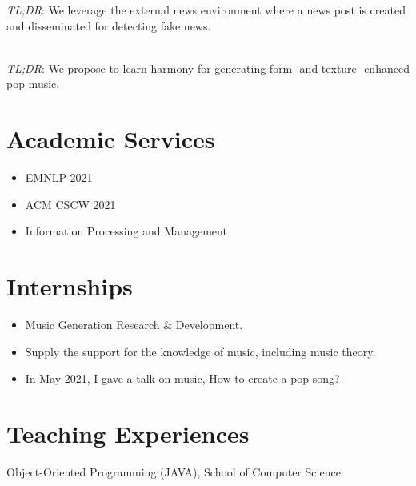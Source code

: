 \documentclass{resume}
\begin{document}
{{
{\small {}
\small
\textit{TL;DR}: We leverage the external news environment where a news post is created and disseminated for detecting fake news.

\textbf{\\ \large {}}
{\small {}
}
\small
\textit{TL;DR}: We propose to learn harmony for generating form- and texture- enhanced pop music.

\section{Academic Services}
\begin{itemize}
  \item EMNLP 2021
  \item ACM CSCW 2021
  \item Information Processing and Management
\end{itemize}

\section{Internships}
{\small {}
}
\begin{itemize}
  \item Music Generation Research \& Development.
  \item Supply the support for the knowledge of music, including music theory. 
  \item In May 2021, I gave a talk on music, \href{https://www.zhangxueyao.com/data/wcpr-pop-music.pdf}{\underline{How to create a pop song?}}
\end{itemize}

\section{Teaching Experiences}
\small
Object-Oriented Programming (JAVA), School of Computer Science

}}}
\end{document}
